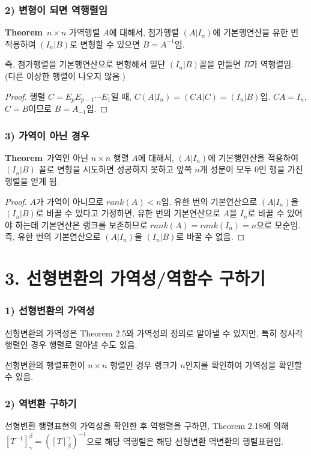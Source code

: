\subsubsection*{2) 변형이 되면 역행렬임}
\textbf{Theorem}\, $n \times n$ 가역행렬 $A$에 대해서, 첨가행렬 $(A|I_n)$에 기본행연산을 유한 번 적용하여 $(I_n|B)$로 변형할 수 있으면 $B=A^{-1}$임.

즉, 첨가행렬을 기본행연산으로 변형해서 일단 $(I_n|B)$꼴을 만들면 $B$가 역행렬임. (다른 이상한 행렬이 나오지 않음.)

\begin{proof}
행렬 $C=E_{p}E_{p-1} \cdots E_1$일 때, $C(A|I_n)=(CA|C)=(I_n|B)$임. $CA=I_n$, $C=B$이므로 $B=A_{-1}$임.
\end{proof}

\subsubsection*{3) 가역이 아닌 경우}
\textbf{Theorem}\, 가역인 아닌 $n \times n$ 행렬 $A$에 대해서, $(A|I_n)$에 기본행연산을 적용하여 $(I_n|B)$ 꼴로 변형을 시도하면 성공하지 못하고 앞쪽 $n$개 성분이 모두 0인 행을 가진 행렬을 얻게 됨.

\begin{proof}
$A$가 가역이 아니므로 $rank(A) < n$임. 유한 번의 기본연산으로 $(A|I_n)$을 $(I_n|B)$로 바꿀 수 있다고 가정하면, 유한 번의 기본연산으로 $A$을 $I_n$로 바꿀 수 있어야 하는데 기본연산은 랭크를 보존하므로 $rank(A)=rank(I_n)=n$으로 모순임. 즉, 유한 번의 기본연산으로 $(A|I_n)$을 $(I_n|B)$로 바꿀 수 없음.
\end{proof}


\newpage


\section*{3. 선형변환의 가역성/역함수 구하기}
\subsubsection*{1) 선형변환의 가역성}
선형변환의 가역성은 Theorem 2.5와 가역성의 정의로 알아낼 수 있지만, 특히 정사각행렬인 경우 행렬로 알아낼 수도 있음.

선형변환의 행렬표현이 $n \times n$ 행렬인 경우 랭크가 $n$인지를 확인하여 가역성을 확인할 수 있음.

\subsubsection*{2) 역변환 구하기}
선형변환 행렬표현의 가역성을 확인한 후 역행렬을 구하면, Theorem 2.18에 의해 $[T^{-1}]_{\gamma}^{\beta}=([T]_{\beta}^{\gamma})^{-1}$으로 해당 역행렬은 해당 선형변환 역변환의 행렬표현임.

